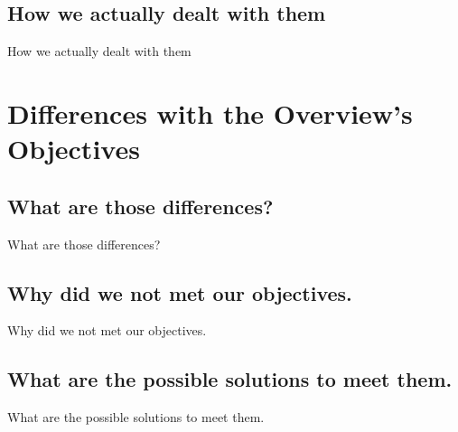 \documentclass{beamer}
\begin{document}
\subsection{How we actually dealt with them}
\begin{frame}{How we actually dealt with them}

\end{frame}

\section{Differences with the Overview's Objectives}
\subsection{What are those differences?}
\begin{frame}{What are those differences?}

\end{frame}

\subsection{Why did we not met our objectives.}
\begin{frame}{Why did we not met our objectives.}

\end{frame}

\subsection{What are the possible solutions to meet them.}
\begin{frame}{What are the possible solutions to meet them.}

\end{frame}
\end{document}
